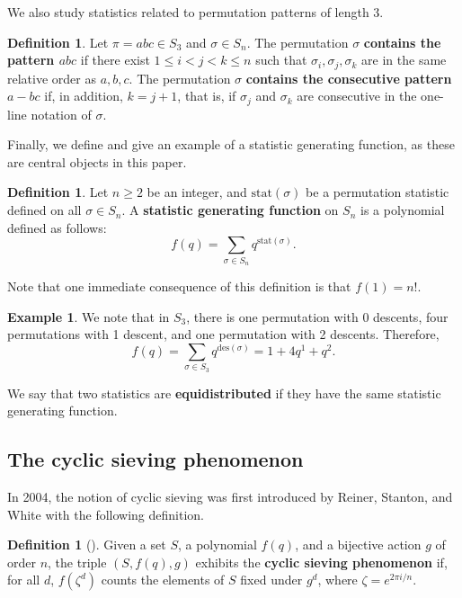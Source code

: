 \documentclass{amsart}
\theoremstyle{definition}
\newtheorem{definition}[thm]{Definition}
\newtheorem{example}[thm]{Example}
\begin{document}
We also study statistics related to permutation patterns of length $3$.
\begin{definition}
  \label{def:patterns}
  Let $\pi=abc\in S_3$ and $\sigma\in S_n$. The permutation $\sigma$ \textbf{contains the pattern $abc$} if there exist $1\leq i<j<k\leq n$ such that $\sigma_i,\sigma_j,\sigma_k$ are in the same relative order as $a,b,c$. The permutation $\sigma$ \textbf{contains the consecutive pattern $a-bc$} if, in addition, $k=j+1$, that is, if $\sigma_j$ and $\sigma_k$ are consecutive in the one-line notation of $\sigma$.
\end{definition}

Finally, we define and give an example of a statistic generating function, as these are central objects in this paper.
\begin{definition}
  \label{def:stat_gen_fun}
  Let $n\geq 2$ be an integer, and $\textrm{stat}(\sigma)$ be a permutation statistic defined on all $\sigma \in S_n$. A \textbf{statistic generating function} on $S_n$ is a polynomial defined as follows:
  \[f(q) = \sum_{\sigma \in S_n} q^{\textrm{stat}(\sigma)}.\]
\end{definition}
Note that one immediate consequence of this definition is that $f(1)=n!$.


\begin{example}
  We note that in $S_3$, there is one permutation with 0 descents, four permutations with 1 descent, and one permutation with 2 descents. Therefore,
  \[f(q) = \sum_{\sigma \in S_3} q^{\textrm{des}(\sigma)} = 1+4q^1+q^2.\]
\end{example}

We say that two statistics are \textbf{equidistributed} if they have the same statistic generating function.

\subsection{The cyclic sieving phenomenon}
\label{sec:bg_CSP}
In 2004, the notion of cyclic sieving was first introduced by Reiner, Stanton, and White with the following definition.


\begin{definition}[\cite{ReStWh2004}]
  Given a set $S$, a polynomial $f(q)$, and a bijective action $g$ of order $n$, the triple $(S,f(q),g)$ exhibits the \textbf{cyclic sieving phenomenon} 
  if, for all $d$, $f(\zeta^d)$
  counts the elements of $S$ fixed under $g^d$, where $\zeta=e^{2\pi i /n}$.
\end{definition}
\end{document}
